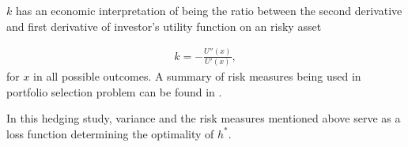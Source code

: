 $k$ has an economic interpretation of being the ratio between the second derivative and first derivative
of investor's utility function on an risky asset

\begin{align}
	k = -\frac{U''(x)}{U'(x)},
	\end{align}
for $x$ in all possible outcomes.
A summary of risk measures being used in portfolio selection problem can be found in \citet{hardle2008applied}.\medskip

In this hedging study, variance and the risk measures mentioned above serve as a loss function determining the optimality
of $h^\ast$.
%
